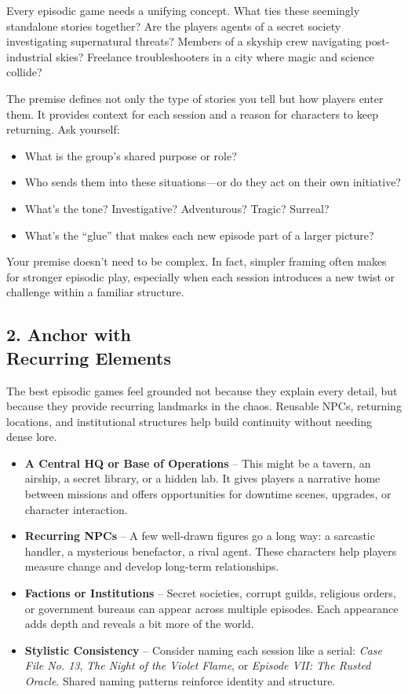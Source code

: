 Every episodic game needs a unifying concept. What ties these seemingly standalone stories together? Are the players agents of a secret society investigating supernatural threats? Members of a skyship crew navigating post-industrial skies? Freelance troubleshooters in a city where magic and science collide?

The premise defines not only the type of stories you tell but how players enter them. It provides context for each session and a reason for characters to keep returning. Ask yourself:

\begin{itemize}
    \item What is the group’s shared purpose or role?
    \item Who sends them into these situations—or do they act on their own initiative?
    \item What’s the tone? Investigative? Adventurous? Tragic? Surreal?
    \item What’s the “glue” that makes each new episode part of a larger picture?
\end{itemize}

Your premise doesn't need to be complex. In fact, simpler framing often makes for stronger episodic play, especially when each session introduces a new twist or challenge within a familiar structure.

\subsection*{2. Anchor with\\ Recurring Elements}

The best episodic games feel grounded not because they explain every detail, but because they provide recurring landmarks in the chaos. Reusable NPCs, returning locations, and institutional structures help build continuity without needing dense lore.

\begin{itemize}
    \item \textbf{A Central HQ or Base of Operations} – This might be a tavern, an airship, a secret library, or a hidden lab. It gives players a narrative home between missions and offers opportunities for downtime scenes, upgrades, or character interaction.

    \item \textbf{Recurring NPCs} – A few well-drawn figures go a long way: a sarcastic handler, a mysterious benefactor, a rival agent. These characters help players measure change and develop long-term relationships.

    \item \textbf{Factions or Institutions} – Secret societies, corrupt guilds, religious orders, or government bureaus can appear across multiple episodes. Each appearance adds depth and reveals a bit more of the world.

    \item \textbf{Stylistic Consistency} – Consider naming each session like a serial: \emph{Case File No. 13}, \emph{The Night of the Violet Flame}, or \emph{Episode VII: The Rusted Oracle}. Shared naming patterns reinforce identity and structure.
\end{itemize}

